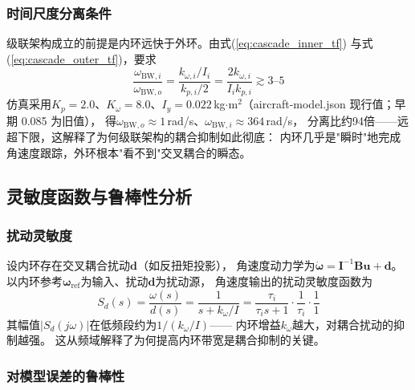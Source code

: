 \subsubsection{时间尺度分离条件}

级联架构成立的前提是内环远快于外环。由式(\ref{eq:cascade_inner_tf})
与式(\ref{eq:cascade_outer_tf})，要求
\begin{equation}
    \boxed{
    \frac{\omega_{\mathrm{BW},i}}{\omega_{\mathrm{BW},o}}
    = \frac{k_{\omega,i}/I_i}{k_{p,i}/2}
    = \frac{2k_{\omega,i}}{I_i k_{p,i}} \gtrsim 3\text{--}5
    }
    \label{eq:tss_condition_ch}
\end{equation}
仿真采用$K_p=2.0$、$K_\omega=8.0$、$I_y=0.022$\,kg$\cdot$m$^2$（aircraft-model.json 现行值；早期 0.085 为旧值），
得$\omega_{\mathrm{BW},o}\approx1$\,rad/s、$\omega_{\mathrm{BW},i}\approx364$\,rad/s，
分离比约94倍——远超下限，这解释了为何级联架构的耦合抑制如此彻底：
内环几乎是"瞬时"地完成角速度跟踪，外环根本"看不到"交叉耦合的瞬态。

\subsection{灵敏度函数与鲁棒性分析}
\label{sec:cascade_sensitivity}

\subsubsection{扰动灵敏度}

设内环存在交叉耦合扰动$\mathbf{d}$（如反扭矩投影），
角速度动力学为$\dot{\boldsymbol{\omega}}=\mathbf{I}^{-1}\mathbf{B}\mathbf{u}+\mathbf{d}$。
以内环参考$\boldsymbol{\omega}_{\mathrm{ref}}$为输入、扰动$\mathbf{d}$为扰动源，
角速度输出的扰动灵敏度函数为
\begin{equation}
    S_d(s) = \frac{\omega(s)}{d(s)} = \frac{1}{s + k_{\omega}/I}
    = \frac{\tau_i}{\tau_i s + 1}\cdot\frac{1}{\tau_i}\cdot\frac{1}{1}
    \label{eq:cascade_sens}
\end{equation}
其幅值$|S_d(j\omega)|$在低频段约为$1/(k_\omega/I)$——
内环增益$k_\omega$越大，对耦合扰动的抑制越强。
这从频域解释了为何提高内环带宽是耦合抑制的关键。

\subsubsection{对模型误差的鲁棒性}

